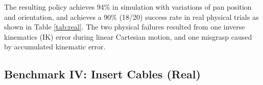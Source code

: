 The resulting policy achieves 94\% in simulation with variations of pan position and orientation, and achieves a 90\% (18/20) success rate in real physical trials as shown in Table \ref{tab:real}. 
The two physical failures resulted from one inverse kinematics (IK) error during linear Cartesian motion, and one misgrasp caused by accumulated kinematic error.








\subsection{Benchmark IV: Insert Cables (Real)}

